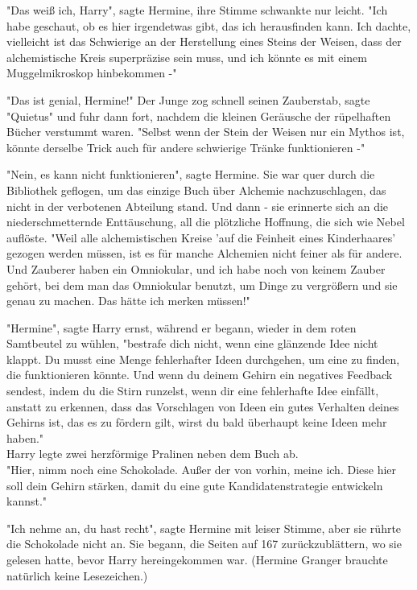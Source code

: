 {"Das weiß ich, Harry", sagte Hermine, ihre Stimme schwankte nur leicht. "Ich habe geschaut, ob es hier irgendetwas gibt, das ich herausfinden kann. Ich dachte, vielleicht ist das Schwierige an der Herstellung eines Steins der Weisen, dass der alchemistische Kreis superpräzise sein muss, und ich könnte es mit einem Muggelmikroskop hinbekommen -"

"Das ist genial, Hermine!" Der Junge zog schnell seinen Zauberstab, sagte "Quietus" und fuhr dann fort, nachdem die kleinen Geräusche der rüpelhaften Bücher verstummt waren. "Selbst wenn der Stein der Weisen nur ein Mythos ist, könnte derselbe Trick auch für andere schwierige Tränke funktionieren -"

"Nein, es kann nicht funktionieren", sagte Hermine. Sie war quer durch die Bibliothek geflogen, um das einzige Buch über Alchemie nachzuschlagen, das nicht in der verbotenen Abteilung stand. Und dann - sie erinnerte sich an die niederschmetternde Enttäuschung, all die plötzliche Hoffnung, die sich wie Nebel auflöste. "Weil alle alchemistischen Kreise 'auf die Feinheit eines Kinderhaares' gezogen werden müssen, ist es für manche Alchemien nicht feiner als für andere. Und Zauberer haben ein Omniokular, und ich habe noch von keinem Zauber gehört, bei dem man das Omniokular benutzt, um Dinge zu vergrößern und sie genau zu machen. Das hätte ich merken müssen!"

"Hermine", sagte Harry ernst, während er begann, wieder in dem roten Samtbeutel zu wühlen, "bestrafe dich nicht, wenn eine glänzende Idee nicht klappt. Du musst eine Menge fehlerhafter Ideen durchgehen, um eine zu finden, die funktionieren könnte. Und wenn du deinem Gehirn ein negatives Feedback sendest, indem du die Stirn runzelst, wenn dir eine fehlerhafte Idee einfällt, anstatt zu erkennen, dass das Vorschlagen von Ideen ein gutes Verhalten deines Gehirns ist, das es zu fördern gilt, wirst du bald überhaupt keine Ideen mehr haben."\\ Harry legte zwei herzförmige Pralinen neben dem Buch ab.\\ "Hier, nimm noch eine Schokolade. Außer der von vorhin, meine ich. Diese hier soll dein Gehirn stärken, damit du eine gute Kandidatenstrategie entwickeln kannst."

"Ich nehme an, du hast recht", sagte Hermine mit leiser Stimme, aber sie rührte die Schokolade nicht an. Sie begann, die Seiten auf 167 zurückzublättern, wo sie gelesen hatte, bevor Harry hereingekommen war. (Hermine Granger brauchte natürlich keine Lesezeichen.)

}
